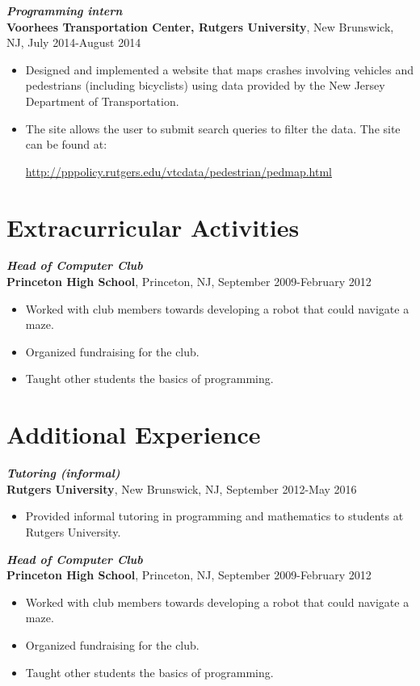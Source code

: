 \documentclass[12pt]{article}
\begin{document}
\textit{\textbf{Programming intern}} \\
\textbf{Voorhees Transportation Center, Rutgers University}, New Brunswick, NJ, July 2014-August 
2014
\begin{itemize}
\item
Designed and implemented a website that maps crashes involving vehicles and pedestrians (including 
bicyclists) using data provided by the New Jersey Department of Transportation.
\item
The site allows the user to submit search queries to filter the data. The site can be found at:
\begin{center}
\url{http://pppolicy.rutgers.edu/vtcdata/pedestrian/pedmap.html}
\end{center}
\end{itemize}

\section*{Extracurricular Activities}

\textit{\textbf{Head of Computer Club}} \\
\textbf{Princeton High School}, Princeton, NJ, September 2009-February 2012
\begin{itemize}
\item
Worked with club members towards developing a robot that could navigate a maze.
\item
Organized fundraising for the club.
\item
Taught other students the basics of programming.
\end{itemize}

\iffalse

\section*{Additional Experience}

\textit{\textbf{Tutoring (informal)}} \\
\textbf{Rutgers University}, New Brunswick, NJ, September 2012-May 2016
\begin{itemize}
\item
Provided informal tutoring in programming and mathematics to students at Rutgers University.
\end{itemize}

\textit{\textbf{Head of Computer Club}} \\
\textbf{Princeton High School}, Princeton, NJ, September 2009-February 2012
\begin{itemize}
\item
Worked with club members towards developing a robot that could navigate a maze.
\item
Organized fundraising for the club.
\item
Taught other students the basics of programming.
\end{itemize}
\end{document}
